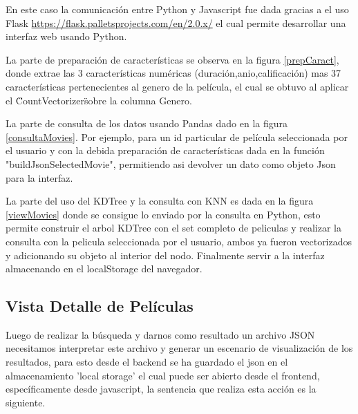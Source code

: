\documentclass{article}
\begin{document}
    	    En este caso la comunicación entre Python y Javascript fue dada gracias a el uso Flask \url{https://flask.palletsprojects.com/en/2.0.x/} el cual permite desarrollar una interfaz web usando Python.
    	    
    	    La parte de preparación de características se observa en la figura \ref{prepCaract}, donde extrae las 3 características numéricas (duración,anio,calificación) mas 37 características pertenecientes al genero de la película, el cual se obtuvo al aplicar el \"CountVectorizer\" sobre la columna Genero.
    	    
    	    
    	    
    	    La parte de consulta de los datos usando Pandas dado en la figura \ref{consultaMovies}. Por ejemplo, para un id particular de película seleccionada por el usuario y con la debida preparación de características dada en la función "buildJsonSelectedMovie", permitiendo asi devolver un dato como objeto Json para la interfaz.
    	    
    	    
    	    La parte del uso del KDTree y la consulta con KNN es dada en la figura \ref{viewMovies} donde se consigue lo enviado por la consulta en Python, esto permite construir el arbol KDTree con el set completo de peliculas y realizar la consulta con la pelicula seleccionada por el usuario, ambos ya fueron vectorizados y adicionando su objeto al interior del nodo. Finalmente servir a la interfaz almacenando en el localStorage del navegador.
    	    
    	    
    	    
    	\subsection{Vista Detalle de Películas}
    	
    	Luego de realizar la búsqueda y darnos como resultado un archivo JSON necesitamos interpretar este archivo y generar un escenario de visualización de los resultados, para esto desde el backend se ha guardado el json en el almacenamiento 'local storage' el cual puede ser abierto desde el frontend, específicamente desde javascript, la sentencia que realiza esta acción es la siguiente.
    	
\end{document}
